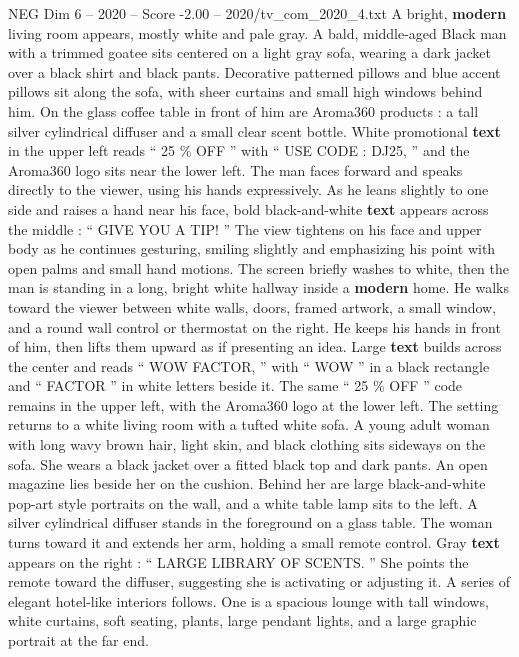\begin{textsample}{NEG Dim 6 – 2020 – Score -2.00 – 2020/tv\_com\_2020\_4.txt}  \label{ex:f6_neg_037}
A bright, \textbf{modern} living room appears, mostly white and pale gray.
A bald, middle-aged Black man with a trimmed goatee sits centered on a light gray sofa, wearing a dark jacket over a black shirt and black pants.
Decorative patterned pillows and blue accent pillows sit along the sofa, with sheer curtains and small high windows behind him.
On the glass coffee table in front of him are Aroma360 products : a tall silver cylindrical diffuser and a small clear scent bottle.
White promotional \textbf{text} in the upper left reads “ 25 \% OFF ” with “ USE CODE : DJ25, ” and the Aroma360 logo sits near the lower left.
The man faces forward and speaks directly to the viewer, using his hands expressively.
As he leans slightly to one side and raises a hand near his face, bold black-and-white \textbf{text} appears across the middle : “ GIVE YOU A TIP! ” The view tightens on his face and upper body as he continues gesturing, smiling slightly and emphasizing his point with open palms and small hand motions.
The screen briefly washes to white, then the man is standing in a long, bright white hallway inside a \textbf{modern} home.
He walks toward the viewer between white walls, doors, framed artwork, a small window, and a round wall control or thermostat on the right.
He keeps his hands in front of him, then lifts them upward as if presenting an idea.
Large \textbf{text} builds across the center and reads “ WOW FACTOR, ” with “ WOW ” in a black rectangle and “ FACTOR ” in white letters beside it.
The same “ 25 \% OFF ” code remains in the upper left, with the Aroma360 logo at the lower left.
The setting returns to a white living room with a tufted white sofa.
A young adult woman with long wavy brown hair, light skin, and black clothing sits sideways on the sofa.
She wears a black jacket over a fitted black top and dark pants.
An open magazine lies beside her on the cushion.
Behind her are large black-and-white pop-art style portraits on the wall, and a white table lamp sits to the left.
A silver cylindrical diffuser stands in the foreground on a glass table.
The woman turns toward it and extends her arm, holding a small remote control.
Gray \textbf{text} appears on the right : “ LARGE LIBRARY OF SCENTS. ” She points the remote toward the diffuser, suggesting she is activating or adjusting it.
A series of elegant hotel-like interiors follows.
One is a spacious lounge with tall windows, white curtains, soft seating, plants, large pendant lights, and a large graphic portrait at the far end.

\end{textsample}
